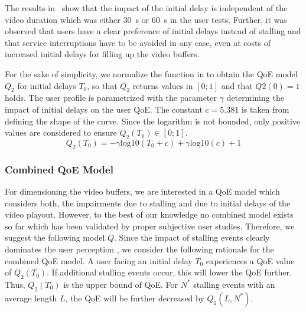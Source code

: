 The results in~\cite{Hossfeld2012c} show that the impact of the initial delay is independent of the video duration which was either \SI{30}{\second} or \SI{60}{\second} in the user tests.
Further, it was observed that users have a clear preference of initial delays instead
of stalling and that service interruptions have to be avoided in any case, even at costs of increased initial delays for filling up the video buffers. 

For the sake of simplicity, we normalize the function in  to obtain the \gls{QoE} model \(Q_2\) for initial delays \(T_0\), so that \(Q_2\) returns values in \(\left[0;1\right]\) and that \(Q2(0)=1\) holds.
The user profile is parametrized with the parameter \(\gamma\) determining the impact of initial delays on the user \gls{QoE}.
The constant \(c=5.381\) is taken from  defining the shape of the curve. 
Since the logarithm is not bounded, only positive values are considered to ensure \(Q_2(T_0) \in [0;1]\).
\begin{equation}
Q_2(T_0)= -\gamma \mathrm{log10}\left(T_0 + c\right) + \gamma \mathrm{log10}\left(c\right)+ 1 
\label{eq:application:qoe_user_behaviour:typical_user_scenarios:initial_delay:parameterized_model}
\end{equation}

\subsubsection*{Combined QoE Model}\label{sec:application:qoe_user_behaviour:typical_user_scenarios:youtube_qoe:combined}
For dimensioning the video buffers, we are interested in a \gls{QoE} model which considers both, the impairments due to stalling and due to initial delays of the video playout.
However, to the best of our knowledge no combined model exists so far which has been validated by proper subjective user studies.
Therefore, we suggest the following model \(Q\).
Since the impact of stalling events clearly dominates the user perception \cite{Hossfeld2012a,Hossfeld2012c}, we consider the following rationale for the combined QoE model.
A user facing an initial delay \(T_0\) experiences a \gls{QoE} value of \(Q_2(T_0)\).
If additional stalling events occur, this will lower the QoE further.
Thus, \(Q_2(T_0)\) is the upper bound of \gls{QoE}.
For \(N^*\) stalling events with an average length \(L\), the \gls{QoE} will be further decreased by \(Q_1(L,N^*)\).

